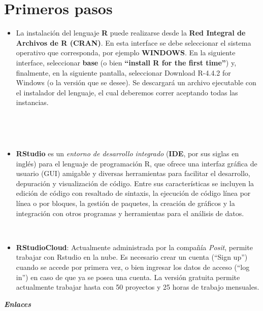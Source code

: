 \documentclass[
  spanish,
  letterpaper,
  DIV=11,
  numbers=noendperiod]{scrreprt}
\providecommand{\tightlist}{%
  \setlength{\itemsep}{0pt}\setlength{\parskip}{0pt}}
\begin{document}
\section{Primeros pasos}\label{primeros-pasos}

\begin{itemize}
\tightlist
\item
  La instalación del lenguaje \textbf{R} puede realizarse desde la
  \textbf{Red Integral de Archivos de R (CRAN)}. En esta interface se
  debe seleccionar el sistema operativo que corresponda, por ejemplo
  \textbf{WINDOWS}. En la siguiente interface, seleccionar \textbf{base}
  (o bien \textbf{``install R for the first time''}) y, finalmente, en
  la siguiente pantalla, seleccionar Download R-4.4.2 for Windows (o la
  versión que se desee). Se descargará un archivo ejecutable con el
  instalador del lenguaje, el cual deberemos correr aceptando todas las
  instancias.
\end{itemize}

~

~

\begin{itemize}
\tightlist
\item
  \textbf{RStudio} es un \emph{entorno de desarrollo integrado}
  (\textbf{IDE}, por sus siglas en inglés) para el lenguaje de
  programación R, que ofrece una interfaz gráfica de usuario (GUI)
  amigable y diversas herramientas para facilitar el desarrollo,
  depuración y visualización de código. Entre sus características se
  incluyen la edición de código con resaltado de sintaxis, la ejecución
  de código línea por línea o por bloques, la gestión de paquetes, la
  creación de gráficos y la integración con otros programas y
  herramientas para el análisis de datos.
\end{itemize}

~

\begin{itemize}
\tightlist
\item
  \textbf{RStudioCloud}: Actualmente administrada por la compañía
  \emph{Posit}, permite trabajar con Rstudio en la nube. Es necesario
  crear un cuenta (``Sign up'') cuando se accede por primera vez, o bien
  ingresar los datos de acceso (``log in'') en caso de que ya se posea
  una cuenta. La versión gratuita permite actualmente trabajar hasta con
  50 proyectos y 25 horas de trabajo mensuales.
\end{itemize}

\textbf{\emph{Enlaces}}
\end{document}
